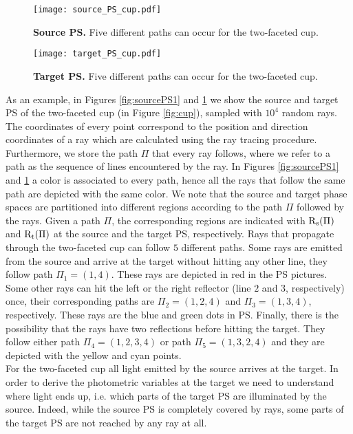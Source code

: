 \begin{figure}[t]
  \begin{minipage}[]{0.49\textwidth}
\centering
    \texttt{[image: source\_PS\_cup.pdf]}
    \caption{\textbf{Source PS.} Five different paths can occur for the two-faceted cup.}
    \label{fig:sourcePS1}
  \end{minipage}
\hfill
  \begin{minipage}[]{0.49\textwidth}
\centering
    \texttt{[image: target\_PS\_cup.pdf]}
  \caption{\textbf{Target PS.} Five different paths can occur for the two-faceted cup.}
   \label{fig:targetPS1}
 \end{minipage}
\end{figure}
As an example, in Figures \ref{fig:sourcePS1} and \ref{fig:targetPS1} we show the source and target PS of the two-faceted cup (in Figure \ref{fig:cup}), sampled with $10^4$ random rays. The coordinates of every point correspond to the position and direction coordinates of a ray which are calculated using the ray tracing procedure. Furthermore, we store the path $\Pi$ that every ray follows, where we refer to a path as the sequence of lines encountered by the ray.
In Figures \ref{fig:sourcePS1} and \ref{fig:targetPS1} a color is associated to every path, hence all the rays that follow the same path are depicted with the same color.
We note that the source and target phase spaces are partitioned into different regions according to the path $\Pi$ followed by the rays.
Given a path $\Pi$, the corresponding regions are indicated with $\mbox{$\textup{R}$}_\textrm{s}(\Pi)$ and $\mbox{$\textup{R}$}_\textrm{t}(\Pi)$ at the source and the target PS, respectively.
Rays that propagate through the two-faceted cup can follow $5$ different paths. Some rays are emitted from the source and arrive at the target without hitting any other line, they follow path $\Pi_1= (1,4)$. These rays are depicted in red in the PS pictures. Some other rays can hit the left or the right reflector (line $2$ and $3$, respectively) once, their corresponding paths are $\Pi_2 = (1,2,4)$ and $\Pi_3 = (1,3,4)$, respectively. These rays are the blue and green dots in PS. Finally, there is the possibility that the rays have two reflections before hitting the target. They follow either path $\Pi_4 = (1,2,3,4)$ or path $\Pi_5 = (1,3,2,4)$ and they are depicted with the yellow and cyan points.
\\ \indent For the two-faceted cup all light emitted by the source arrives at the target. In order to derive the photometric variables at the target we need to understand where light ends up, i.e. which parts of the target PS are illuminated by the source. Indeed, while the source PS is completely covered by rays, some parts of the target PS are not reached by any ray at all.

